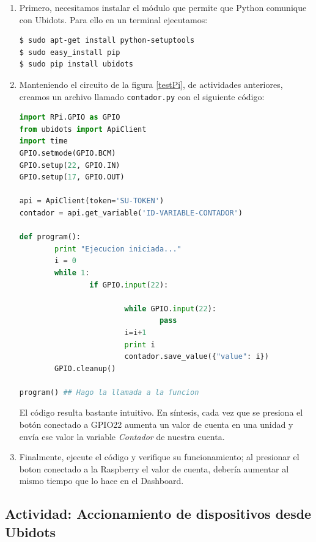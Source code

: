 \documentclass[letterpaper, 10pt]{report}
\begin{document}
\begin{enumerate}
\item Primero, necesitamos instalar el módulo que permite que Python comunique con Ubidots. Para ello en un terminal ejecutamos:

\begin{verbatim}
$ sudo apt-get install python-setuptools
$ sudo easy_install pip
$ sudo pip install ubidots
\end{verbatim}



\item Manteniendo el circuito de la figura \ref{testPi}, de actividades anteriores, creamos un archivo llamado \texttt{contador.py} con el siguiente código:

\begin{lstlisting}[language=Python, style=myArduino]
import RPi.GPIO as GPIO
from ubidots import ApiClient
import time
GPIO.setmode(GPIO.BCM)
GPIO.setup(22, GPIO.IN)
GPIO.setup(17, GPIO.OUT)

api = ApiClient(token='SU-TOKEN')
contador = api.get_variable('ID-VARIABLE-CONTADOR')

def program():
        print "Ejecucion iniciada..."
        i = 0
        while 1:
                if GPIO.input(22):

                        while GPIO.input(22):
                                pass
                        i=i+1
                        print i
                        contador.save_value({"value": i})
        GPIO.cleanup()

program() ## Hago la llamada a la funcion
\end{lstlisting}

El código resulta bastante intuitivo. En síntesis, cada vez que se presiona el botón conectado a GPIO22 aumenta un valor de cuenta en una unidad y envía ese valor la variable \emph{Contador} de nuestra cuenta.

\item Finalmente, ejecute el código y verifique su funcionamiento; al presionar el boton conectado a la Raspberry el valor de cuenta, debería aumentar al mismo tiempo que lo hace en el Dashboard.
\end{enumerate}

\subsection{Actividad: Accionamiento de dispositivos desde Ubidots}
\end{document}
